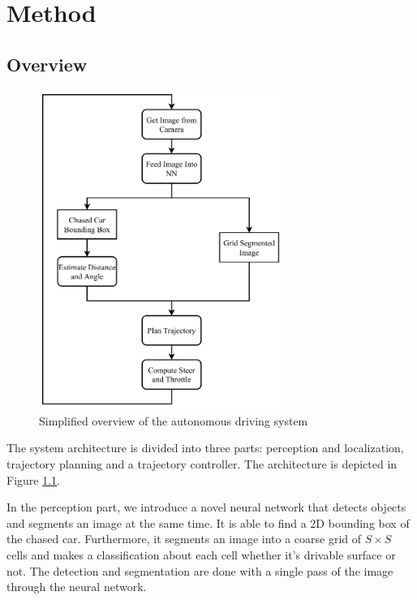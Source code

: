 \documentclass{ctuthesis/ctuthesis}
\begin{document}
\chapter{Method}\label{s:method}
\section{Overview}
\begin{figure}[]
    \centering
    \includegraphics[width=0.7\textwidth]{images/bachelor_diagram.pdf}
    \caption{Simplified overview of the autonomous driving system}\label{f:overview}
\end{figure}

The system architecture is divided into three parts: perception and localization, trajectory planning and a trajectory controller. The architecture is depicted in Figure \ref{f:overview}. \par


In the perception part, we introduce a novel neural network that detects objects and segments an image at the same time. It is able to find a 2D bounding box of the chased car. Furthermore, it segments an image into a coarse grid of $S\times S$ cells and makes a classification about each cell whether it's drivable surface or not. The detection and segmentation are done with a single pass of the image through the neural network. \par
\end{document}
